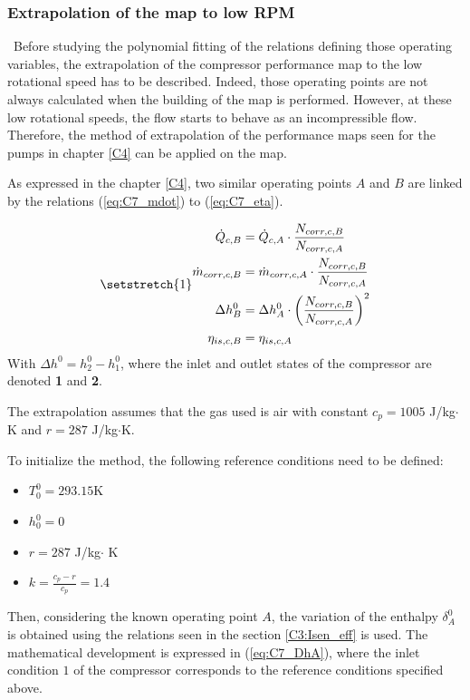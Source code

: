 \subsubsection{Extrapolation of the map to low RPM}
\quad\, Before studying the polynomial fitting of the relations defining those operating variables, the extrapolation of the compressor performance map to the low rotational speed has to be described. Indeed, those operating points are not always calculated when the building of the map is performed. However, at these low rotational speeds, the flow starts to behave as an incompressible flow. Therefore, the method of extrapolation of the performance maps seen for the pumps in chapter \ref{C4} can be applied on the map.

As expressed in the chapter \ref{C4}, two similar operating points $A$ and $B$ are linked by the relations (\ref{eq:C7_mdot}) to (\ref{eq:C7_eta}). 

\begin{subequations}
\setstretch{1}
\begin{align}
    \dot{Q}_{c,B} &= \dot{Q}_{c,A} \cdot \frac{N_{corr,c,B}}{N_{corr,c,A}}\nonumber\\
    \dot{m}_{corr,c,B} &= \dot{m}_{corr,c,A} \cdot \frac{N_{corr,c,B}}{N_{corr,c,A}}\label{eq:C7_mdot}\\
    \Delta h_{B}^0 &= \Delta h_{A}^0 \cdot \left(\frac{N_{corr,c,B}}{N_{corr,c,A}}\right)^2 \label{eq:C7_Dh}\\
    \eta_{is,c,B} &= \eta_{is,c,A} \label{eq:C7_eta}
\end{align}
\end{subequations}
With $\Delta h^0 = h_{2}^0 - h_{1}^0$, where the inlet and outlet states of the compressor are denoted \textbf{1} and \textbf{2}.

The extrapolation assumes that the gas used is air with constant
$c_p=1005$ J/kg$\cdot$K and $r = 287$ J/kg$\cdot$K. 

To initialize the method, the following reference conditions need to be defined:

\begin{itemize}
    \item $T_{0}^0 = 293.15$K
    \item $h_{0}^0 = 0$
    \item $r = 287$ J/kg$\cdot$ K
    \item $k = \frac{c_p - r}{c_p} = 1.4$
\end{itemize}
Then, considering the known operating point $A$, the variation of the enthalpy $\delta_{A}^0$ is obtained  using the relations seen in the section \ref{C3:Isen_eff} is used. The mathematical development is expressed in (\ref{eq:C7_DhA}), where the inlet condition $1$ of the compressor corresponds to the reference conditions specified above.

